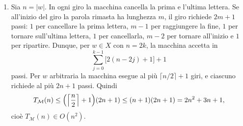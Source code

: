 \begin{sol}
\begin{enumerate}
\[\begin{tikzpicture}[
    scale=0.8, transform shape,
    >=stealth', shorten >=1pt, auto,
    every state/.style={circle, draw, fill=white, minimum size=0.8cm, inner sep=1pt}
]
\draw[->] (q2)  to[bend right=10] node[pos=0.3, above] {$0/$}       (qF0);
\draw[->] (q2)  to[bend right=24] node[pos=0.3, below] {$\square/$} (qF0);
\draw[->] (q2p) to[bend left=10]  node[pos=0.3, below] {$1/$}       (qF0);
\draw[->] (q2p) to[bend left=24]  node[pos=0.3, above] {$\square/$} (qF0);

\draw[->] (q0) -- node[swap] {$\square/$} (qF1);
\end{tikzpicture}
\]

\item Sia $n=|w|$. In ogni giro la macchina cancella la prima e l'ultima lettera. Se all'inizio del giro la parola rimasta ha lunghezza $m$, il giro richiede $2m+1$ passi: $1$ per cancellare la prima lettera, $m-1$ per raggiungere la fine, $1$ per tornare sull'ultima lettera, $1$ per cancellarla, $m-2$ per tornare all'inizio e $1$ per ripartire. Dunque, per $w\in X$ con $n=2k$, la macchina accetta in
\[
\sum_{j=0}^{k-1}\bigl[2(n-2j)+1\bigr]+1
\]
passi. Per $w$ arbitraria la macchina esegue al più $\lceil n/2\rceil+1$ giri, e ciascuno richiede al più $2n+1$ passi. Quindi
\[
T_{\mathcal M}(n)\le\Bigl(\Bigl\lceil\frac n2\Bigr\rceil+1\Bigr)(2n+1)\le(n+1)(2n+1)=2n^2+3n+1,
\]
cioè $T_{\mathcal M}(n)\in O(n^2)$.
\end{enumerate}
\end{sol}